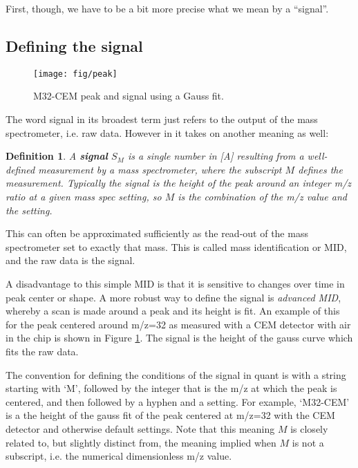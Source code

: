 \documentclass{article}
\newtheorem{definition}{Definition}
\begin{document}
First, though, we have to be a bit more precise what we mean by a ``signal''.

\subsection{Defining the signal}

\begin{figure}
	\centering
	\texttt{[image: fig/peak]}
	\caption{M32-CEM peak and signal using a Gauss fit.}
	\label{fig:peak}
\end{figure}

The word signal in its broadest term just refers to the output of the mass spectrometer, i.e. raw data. However in  it takes on another meaning as well: 

\begin{definition}\label{def:signal}
	A \textbf{signal} $S_M$ is a single number in [A] resulting from a well-defined measurement by a mass spectrometer, where the subscript $M$ defines the measurement. Typically the signal is the height of the peak around an integer m/z ratio at a given mass spec setting, so $M$ is the combination of the m/z value and the setting.
\end{definition}

This can often be approximated sufficiently as the read-out of the mass spectrometer set to exactly that mass. This is called mass identification or MID, and the raw data is the signal.

A disadvantage to this simple MID is that it is sensitive to changes over time in peak center or shape. A more robust way to define the signal is \textit{advanced MID}, whereby a scan is made around a peak and its height is fit. An example of this for the peak centered around m/z=32 as measured with a CEM detector with air in the chip is shown in Figure \ref{fig:peak}. The signal is the height of the gauss curve which fits the raw data.

The convention for defining the conditions of the signal in quant is with a string starting with `M', followed by the integer that is the m/z at which the peak is centered, and then followed by a hyphen and a setting. For example, `M32-CEM' is a the height of the gauss fit of the peak centered at m/z=32 with the CEM detector and otherwise default settings. Note that this meaning $M$ is closely related to, but slightly distinct from, the meaning implied when $M$ is not a subscript, i.e. the numerical dimensionless m/z value.
\end{document}
